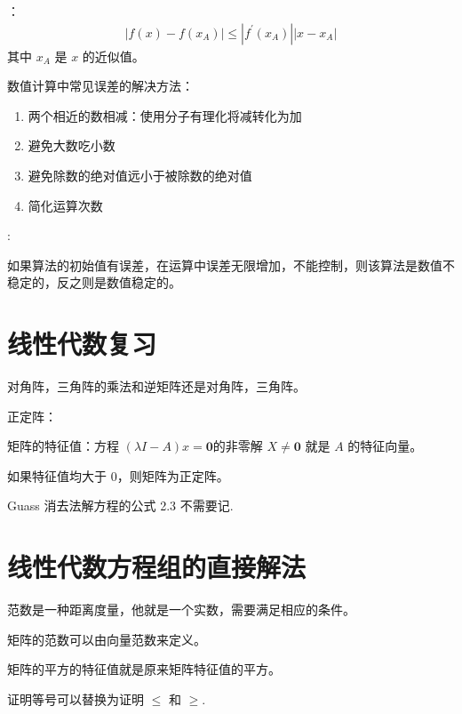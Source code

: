 ：
\begin{align*}
	|f(x) - f(x_A)| \le |f^\prime (x_A)||x - x_A|
\end{align*}
其中 $x_A$ 是 $x$ 的近似值。

数值计算中常见误差的解决方法：
\begin{enumerate}
	\item 两个相近的数相减：使用分子有理化将减转化为加
	\item 避免大数吃小数
	\item 避免除数的绝对值远小于被除数的绝对值
	\item 简化运算次数
\end{enumerate}

:

如果算法的初始值有误差，在运算中误差无限增加，不能控制，则该算法是数值不稳定的，反之则是数值稳定的。

\section{线性代数复习}

对角阵，三角阵的乘法和逆矩阵还是对角阵，三角阵。

正定阵：

矩阵的特征值：方程 $(\lambda I-A)x = \boldsymbol{0}$的非零解 $X\ne\boldsymbol{0}$ 就是 $A$ 的特征向量。

如果特征值均大于 $0$，则矩阵为正定阵。

Guass 消去法解方程的公式 2.3 不需要记.

\section{线性代数方程组的直接解法}

范数是一种距离度量，他就是一个实数，需要满足相应的条件。

矩阵的范数可以由向量范数来定义。

矩阵的平方的特征值就是原来矩阵特征值的平方。

证明等号可以替换为证明 $\le$ 和 $\ge$.

